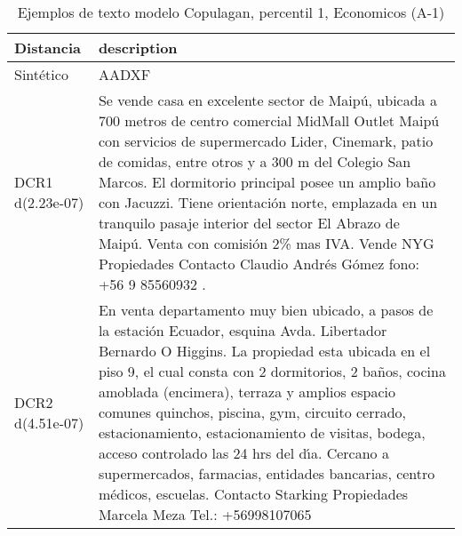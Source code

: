 \begin{table}[H]
\centering
\fontsize{10}{14}\selectfont
\caption{Ejemplos de texto modelo Copulagan, percentil 1, Economicos (A-1)}
\label{table-example-economicos-a-1-copulagan-1p-text}
\begin{tabular}{|l|m{35em}|}
\hline
\rowcolor[gray]{0.8}
Distancia & description \\
\hline Sintético & AADXF \\
\hline DCR1 d(2.23e-07) & Se vende casa en excelente sector de Maip\'u, ubicada a 700 metros de centro comercial MidMall Outlet Maip\'u con servicios de supermercado Lider, Cinemark, patio de comidas, entre otros  y a 300 m del Colegio San Marcos. 
El dormitorio principal  posee un amplio ba\~no con Jacuzzi.  
Tiene orientaci\'on norte, emplazada en un tranquilo pasaje interior del sector El Abrazo de Maip\'u.
Venta con comisi\'on 2\% mas IVA.
Vende NYG Propiedades 
Contacto Claudio Andr\'es G\'omez
fono: +56 9 85560932
. \\
\hline DCR2 d(4.51e-07) & En venta departamento muy bien ubicado, a pasos de la estaci\'on Ecuador, esquina Avda. Libertador Bernardo O Higgins. La propiedad esta ubicada en el piso 9, el cual consta con 2 dormitorios, 2 ba\~nos, cocina amoblada (encimera), terraza y amplios espacio comunes quinchos, piscina, gym, circuito cerrado, estacionamiento, estacionamiento de visitas, bodega, acceso controlado las 24 hrs del d{\'\i}a. Cercano a supermercados, farmacias, entidades bancarias, centro m\'edicos, escuelas.  Contacto Starking Propiedades Marcela Meza Tel.: +56998107065 \\
\hline
\end{tabular}
\end{table}
